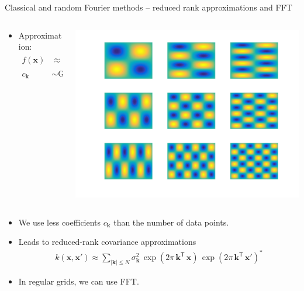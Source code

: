 \documentclass[first=dgreen,second=purple,presentation]{elecslides}
\begin{document}
\begin{frame}{Classical and random Fourier methods -- reduced rank approximations and FFT}
\begin{block}{}
\begin{columns}
\begin{column}{0.5\textwidth}
\begin{itemize}[<+->]
\item Approximation:
{\small
\begin{equation}
\begin{split}
  f(\mathbf{x}) &\approx \sum_{\mathbf{k} \in \mathbb{N}^d}
    c_\mathbf{k} \, \exp\left(2 \pi \, \mathbf{k}^\mathsf{T} \, \mathbf{x} \right) \\
    c_\mathbf{k} &\sim \text{Gaussian}
\end{split}
\nonumber
\end{equation}
}
\end{itemize}
\end{column}
\begin{column}{0.4\textwidth}
\includegraphics[width=1.0\columnwidth]{fourier}
\end{column}
\end{columns}
\end{block}

\begin{itemize}[<+->]
\setcounter{enumi}{2}
\item We use \alert{less coefficients} $c_\mathbf{k}$ than the \alert{number of data points}.
\item Leads to \alert{reduced-rank covariance approximations}
\begin{equation}
\begin{split}
  k(\mathbf{x},\mathbf{x}') \approx \sum_{|\mathbf{k}| \le N} 
    \sigma^2_{\mathbf{k}} \, \exp\left(2 \pi \, \mathbf{k}^\mathsf{T} \, \mathbf{x} \right)
    \, \exp\left(2 \pi \, \mathbf{k}^\mathsf{T} \, \mathbf{x}' \right)^*
\end{split}
\nonumber
\end{equation}
\item In regular grids, \alert{we can use FFT}.
\end{itemize}

\end{frame}
\end{document}
